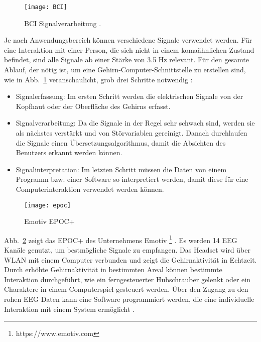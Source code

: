 %
%
\begin{figure}
\centering
\texttt{[image: BCI]}
\caption{BCI Signalverarbeitung \cite{BRAIN}.}
\label{fig:BCI}
\end{figure}
%
\vspace{\baselineskip}
Je nach Anwendungsbereich können verschiedene Signale verwendet werden. Für eine Interaktion mit einer Person, die sich nicht in einem komaähnlichen Zustand befindet, sind alle Signale ab einer Stärke von 3.5 Hz relevant.
\newline \newline
Für den gesamte Ablauf, der nötig ist, um eine Gehirn-Computer-Schnittstelle zu erstellen sind, wie in Abb.~\ref{fig:BCI} veranschaulicht, grob drei Schritte notwendig \cite{BRAIN}:
\begin{itemize}
      \item Signalerfassung: Im ersten Schritt werden die elektrischen Signale von der Kopfhaut oder der Oberfläche des Gehirns erfasst.
      \item Signalverarbeitung: Da die Signale in der Regel sehr schwach sind, werden sie als nächstes verstärkt und von Störvariablen gereinigt. Danach durchlaufen die Signale einen Übersetzungsalgorithmus, damit die Absichten des Benutzers erkannt werden können.
			\item Signalinterpretation: Im letzten Schritt müssen die Daten von einem Programm bzw. einer Software so interpretiert werden, damit diese für eine Computerinteraktion verwendet werden können.
\end{itemize}
%
%
\vspace{\baselineskip}
\vspace{\baselineskip}
\vspace{\baselineskip}
\begin{figure}
\centering
\texttt{[image: epoc]}
\caption{Emotiv EPOC+ \cite{epoc}}
\label{fig:epoc}
\end{figure}
\vspace{\baselineskip}
Abb.~\ref{fig:epoc} zeigt das EPOC+ des Unternehmens Emotiv%
\footnote{https://www.emotiv.com}
%
. Es werden 14 EEG Kanäle genutzt, um bestmögliche Signale zu empfangen. Das Headset wird über WLAN mit einem Computer verbunden und zeigt die Gehirnaktivität in Echtzeit. 
Durch erhöhte Gehirnaktivität in bestimmten Areal können bestimmte Interaktion durchgeführt, wie \zB ein ferngesteuerter Hubschrauber gelenkt oder ein Charaktere in einem Computerspiel gesteuert werden. Über den Zugang zu den rohen EEG Daten kann eine  Software programmiert werden, die eine individuelle Interaktion mit einem System ermöglicht \cite{epoc}. 
